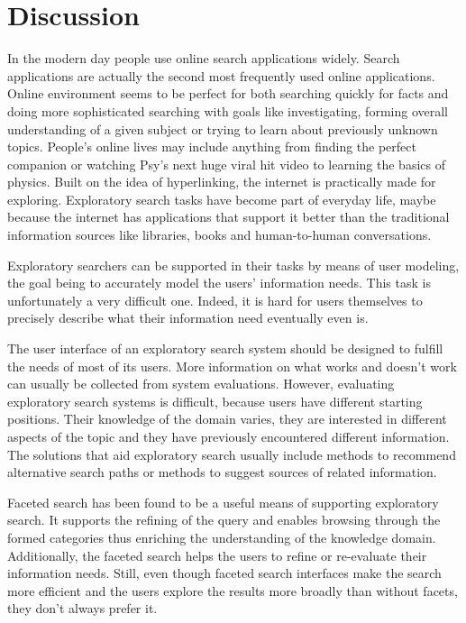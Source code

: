 \section{Discussion}

In the modern day people use online search applications widely. Search applications are actually the second most frequently used online applications. Online environment seems to be perfect for both searching quickly for facts and doing more sophisticated searching with goals like investigating, forming overall understanding of a given subject or trying to learn about previously unknown topics. People's online lives may include anything from finding the perfect companion or watching Psy's next huge viral hit video to learning the basics of physics.  Built on the idea of hyperlinking, the internet is practically made for exploring. Exploratory search tasks have become part of everyday life, maybe because the internet has applications that support it better than the traditional information sources like libraries, books and human-to-human conversations.

Exploratory searchers can be supported in their tasks by means of user modeling, the goal being to accurately model the users' information needs. This task is unfortunately a very difficult one. Indeed, it is hard for users themselves to precisely describe what their information need eventually even is. 

The user interface of an exploratory search system should be designed to fulfill the needs of most of its users. 
More information on what works and doesn't work can usually be collected from system evaluations.
However, evaluating exploratory search systems is difficult, because users have different starting positions.
Their knowledge of the domain varies, they are interested in different aspects of the topic and they have previously encountered different information.
The solutions that aid exploratory search usually include methods to recommend alternative search paths or methods to suggest sources of related information. 

Faceted search has been found to be a useful means of supporting exploratory search. It supports the refining of the query and enables browsing through the formed categories thus enriching the understanding of the knowledge domain. Additionally, the faceted search helps the users to refine or re-evaluate their information needs. Still, even though faceted search interfaces make the search more efficient and the users explore the results more broadly than without facets, they don't always prefer it. 

